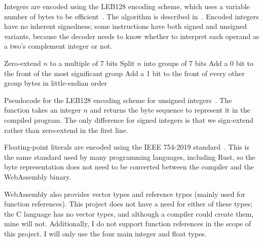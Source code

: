 \documentclass[00-main.tex]{subfiles}
\begin{document}
Integers are encoded using the LEB128 encoding scheme, which uses a variable number of bytes to be efficient~.
The algorithm is described in~.
Encoded integers have no inherent signedness; some instructions have both signed and unsigned variants, because the decoder needs to know whether to interpret each operand as a two's complement integer or not.


\begin{listing}[t]
  \begin{PseudocodeListing}
      \State Zero-extend $n$ to a multiple of 7 bits
      \State Split $n$ into groups of 7 bits
      \State Add a 0 bit to the front of the most significant group
      \State Add a 1 bit to the front of every other group
      \State \Return bytes in little-endian order
    \EndFunction
  \end{PseudocodeListing}
  \caption{Pseudocode for the LEB128 encoding scheme for unsigned integers~. The function takes an integer $n$ and returns the byte sequence to represent it in the compiled program. The only difference for signed integers is that we sign-extend rather than zero-extend in the first line.}
  \label{lst:leb128 pseudocode}
\end{listing}

Floating-point literals are encoded using the IEEE 754-2019 standard~. %
This is the same standard used by many programming languages, including Rust, so the byte representation does not need to be converted between the compiler and the WebAssembly binary.

WebAssembly also provides vector types and reference types (mainly used for function references).
This project does not have a need for either of these types; the C language has no vector types, and although a compiler could create them, mine will not.
Additionally, I do not support function references in the scope of this project.
I will only use the four main integer and float types.
\end{document}
